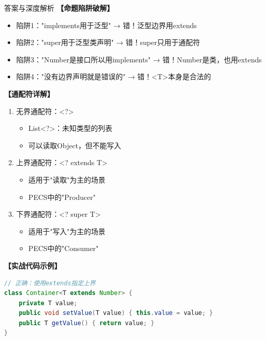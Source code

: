 \documentclass[12pt, a4paper]{ctexart}
\begin{document}
\begin{enumerate}[label=\textbf{\arabic*.}]
\begin{bluebox}{答案与深度解析}
		      \textbf{【命题陷阱破解】}

		      \begin{itemize}[label={}, leftmargin=*, nosep]
			      \item 陷阱1："implements用于泛型" → 错！泛型边界用extends
			      \item 陷阱2："super用于泛型类声明" → 错！super只用于通配符
			      \item 陷阱3："Number是接口所以用implements" → 错！Number是类，也用extends
			      \item 陷阱4："没有边界声明就是错误的" → 错！<T>本身是合法的
		      \end{itemize}

		      \textbf{【通配符详解】}

		      \begin{enumerate}[label={}]
			      \item 无界通配符：<?>
			            \begin{itemize}[label={}, leftmargin=*, nosep]
				            \item List<?>：未知类型的列表
				            \item 可以读取Object，但不能写入
			            \end{itemize}
			      \item 上界通配符：<? extends T>
			            \begin{itemize}[label={}, leftmargin=*, nosep]
				            \item 适用于"读取"为主的场景
				            \item PECS中的"Producer"
			            \end{itemize}
			      \item 下界通配符：<? super T>
			            \begin{itemize}[label={}, leftmargin=*, nosep]
				            \item 适用于"写入"为主的场景
				            \item PECS中的"Consumer"
			            \end{itemize}
		      \end{enumerate}

		      \textbf{【实战代码示例】}

		      \begin{lstlisting}[language=Java]
// 正确：使用extends指定上界
class Container<T extends Number> {
    private T value;
    public void setValue(T value) { this.value = value; }
    public T getValue() { return value; }
}


\end{lstlisting}
\end{bluebox}
\end{enumerate}
\end{document}
